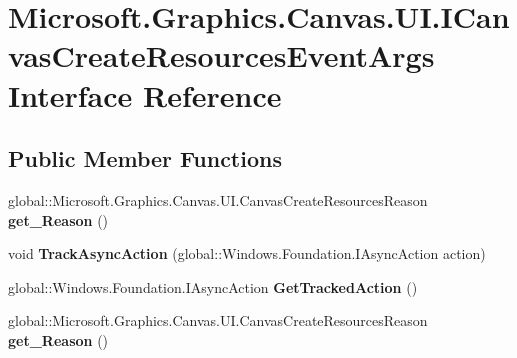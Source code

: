 \hypertarget{interface_microsoft_1_1_graphics_1_1_canvas_1_1_u_i_1_1_i_canvas_create_resources_event_args}{}\section{Microsoft.\+Graphics.\+Canvas.\+U\+I.\+I\+Canvas\+Create\+Resources\+Event\+Args Interface Reference}
\label{interface_microsoft_1_1_graphics_1_1_canvas_1_1_u_i_1_1_i_canvas_create_resources_event_args}
\subsection*{Public Member Functions}
\begin{DoxyCompactItemize}
\item 
\mbox{\label{interface_microsoft_1_1_graphics_1_1_canvas_1_1_u_i_1_1_i_canvas_create_resources_event_args_ab4823024154414a76a2513719de582fd}} 
global\+::\+Microsoft.\+Graphics.\+Canvas.\+U\+I.\+Canvas\+Create\+Resources\+Reason {\bfseries get\+\_\+\+Reason} ()
\item 
\mbox{\label{interface_microsoft_1_1_graphics_1_1_canvas_1_1_u_i_1_1_i_canvas_create_resources_event_args_ae461ac51300d37bcfbf7dc9a26b1cd3c}} 
void {\bfseries Track\+Async\+Action} (global\+::\+Windows.\+Foundation.\+I\+Async\+Action action)
\item 
\mbox{\label{interface_microsoft_1_1_graphics_1_1_canvas_1_1_u_i_1_1_i_canvas_create_resources_event_args_ad6d26af5db5c9cd3edb2cd291ff5c79f}} 
global\+::\+Windows.\+Foundation.\+I\+Async\+Action {\bfseries Get\+Tracked\+Action} ()
\item 
\mbox{\label{interface_microsoft_1_1_graphics_1_1_canvas_1_1_u_i_1_1_i_canvas_create_resources_event_args_ab4823024154414a76a2513719de582fd}} 
global\+::\+Microsoft.\+Graphics.\+Canvas.\+U\+I.\+Canvas\+Create\+Resources\+Reason {\bfseries get\+\_\+\+Reason} ()

\end{DoxyCompactItemize}
